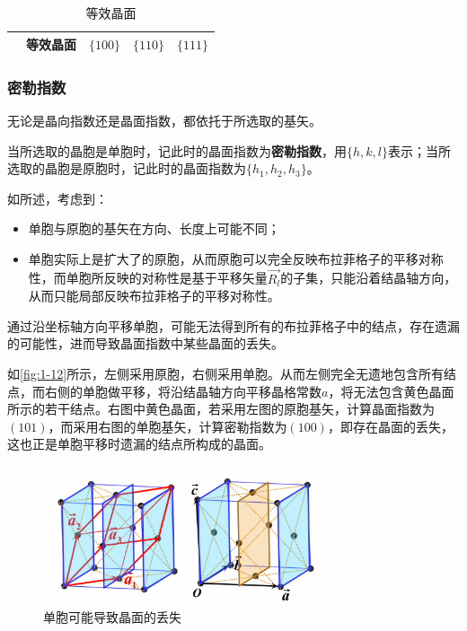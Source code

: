 \begin{table}[!htbp]
{\begin{tabular}{ccccc}
                                           & 等效晶面 & $\{100\}$ & $\{110\}$ & $\{111\}$ \\
            \bottomrule
        \end{tabular}
        }
        \caption{等效晶面}
        \label{tab:1-9}
    \end{table}

\subsubsection{密勒指数}
    无论是晶向指数还是晶面指数，都依托于所选取的基矢。
    
    当所选取的晶胞是单胞时，记此时的晶面指数为\textbf{密勒指数}，用$\{h, k, l\}$表示；当所选取的晶胞是原胞时，记此时的晶面指数为$\{h_1, h_2, h_3\}$。

    如所述，考虑到：
    \begin{itemize}[itemsep=0pt,parsep=0pt]
        \item 单胞与原胞的基矢在方向、长度上可能不同；
        \item 单胞实际上是扩大了的原胞，从而原胞可以完全反映布拉菲格子的平移对称性，而单胞所反映的对称性是基于平移矢量$\vec{R_l}$的子集，只能沿着结晶轴方向，从而只能局部反映布拉菲格子的平移对称性。
    \end{itemize}
    通过沿坐标轴方向平移单胞，可能无法得到所有的布拉菲格子中的结点，存在遗漏的可能性，进而导致晶面指数中某些晶面的丢失。

    如\autoref{fig:1-12}所示，左侧采用原胞，右侧采用单胞。从而左侧完全无遗地包含所有结点，而右侧的单胞做平移，将沿结晶轴方向平移晶格常数$a$，将无法包含黄色晶面所示的若干结点。右图中黄色晶面，若采用左图的原胞基矢，计算晶面指数为$(101)$，而采用右图的单胞基矢，计算密勒指数为$(100)$，即存在晶面的丢失，这也正是单胞平移时遗漏的结点所构成的晶面。

    \begin{figure}[!htbp]
        \centering    
        \includegraphics[height=11em, keepaspectratio=true]{pic/1-42}
        \caption{单胞可能导致晶面的丢失}
        \label{fig:1-12}
    \end{figure}

